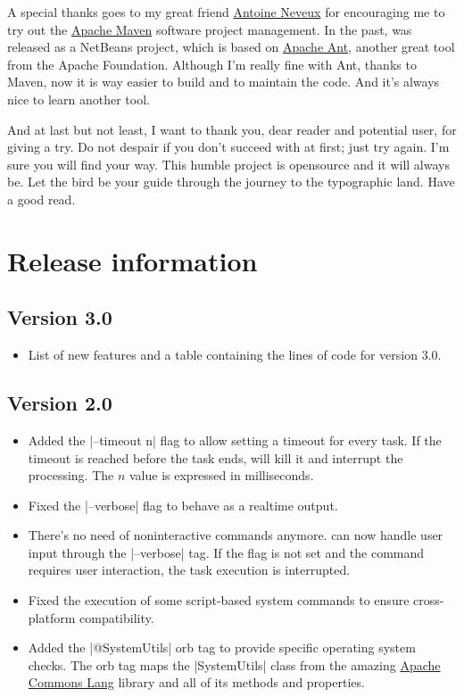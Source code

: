 \documentclass[a4paper,twoside,12pt]{memoir}
\begin{document}
A special thanks goes to my great friend \href{http://antoineneveux.fr/}{Antoine Neveux} for encouraging me to try out the \href{http://maven.apache.org}{Apache Maven} software project management. In the past, \arara was released as a NetBeans project, which is based on \href{http://ant.apache.org/}{Apache Ant}, another great tool from the Apache Foundation. Although I'm really fine with Ant, thanks to Maven, now it is way easier to build and to maintain the code. And it's always nice to learn another tool.

And at last but not least, I want to thank you, dear reader and potential user, 
for giving \arara a try. Do not despair if you don't succeed with \arara at first; just try again. I'm sure you will find your way. This humble project is opensource and it will always be. Let the bird be your guide through the journey to the typographic land. Have a good read.

\cleardoublepage

\section*{Release information}

\subsection*{Version 3.0}
\begin{itemize}
\item[\newfeature] 
     List of new features and a table containing the lines of code for
     version 3.0.
\end{itemize}

\subsection*{Version 2.0}
\begin{itemize}
\item[\newfeature] 
     Added the |--timeout n| flag to allow setting a timeout for every task. If
     the timeout is reached before the task ends, \arara will kill it and 
     interrupt the processing. The $n$ value is expressed in milliseconds.
\item[\bugfix] 
     Fixed the |--verbose| flag to behave as a realtime output.
\item[\newfeature] 
     There's no need of noninteractive commands anymore. \arara can now handle
     user input through the |--verbose| tag. If the flag is not set and the 
     command requires user interaction, the task execution is interrupted.
\item[\bugfix] 
     Fixed the execution of some script-based system commands to ensure 
     cross-platform compatibility.
\item[\newfeature] 
     Added the |@{SystemUtils}| orb tag to provide specific operating system 
     checks. The orb tag maps the |SystemUtils| class from the amazing 
     \href{http://commons.apache.org/lang/}{Apache Commons Lang} library and 
     all of its methods and properties.
\end{itemize}
\end{document}
